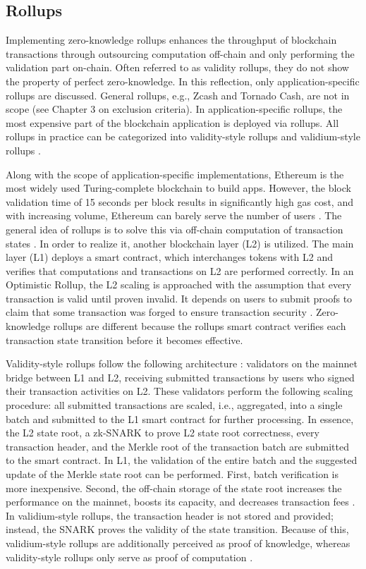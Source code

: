 \subsection{Rollups}
Implementing zero-knowledge rollups enhances the throughput of blockchain transactions through outsourcing computation off-chain and only performing the validation part on-chain. Often referred to as validity rollups, they do not show the property of perfect zero-knowledge. In this reflection, only application-specific rollups are discussed. General rollups, e.g., Zcash and Tornado Cash, are not in scope (see Chapter 3 on exclusion criteria). In application-specific rollups, the most expensive part of the blockchain application is deployed via rollups. All rollups in practice can be categorized into validity-style rollups and validium-style rollups \citep{chen2022review}.

Along with the scope of application-specific implementations, Ethereum is the most widely used Turing-complete blockchain to build apps. However, the block validation time of 15 seconds per block results in significantly high gas cost, and with increasing volume, Ethereum can barely serve the number of users \citep{scalingintro}. The general idea of rollups is to solve this via off-chain computation of transaction states \citep{chen2022review}. In order to realize it, another blockchain layer (L2) is utilized. The main layer (L1) deploys a smart contract, which interchanges tokens with L2 and verifies that computations and transactions on L2 are performed correctly. In an Optimistic Rollup, the L2 scaling is approached with the assumption that every transaction is valid until proven invalid. It depends on users to submit proofs to claim that some transaction was forged to ensure transaction security \citep{zksyncintro}. Zero-knowledge rollups are different because the rollups smart contract verifies each transaction state transition before it becomes effective. 

Validity-style rollups follow the following architecture \citep{buterinrollups}: validators on the mainnet bridge between L1 and L2, receiving submitted transactions by users who signed their transaction activities on L2. These validators perform the following scaling procedure: all submitted transactions are scaled, i.e., aggregated, into a single batch and submitted to the L1 smart contract for further processing. In essence, the L2 state root, a zk-SNARK to prove L2 state root correctness, every transaction header, and the Merkle root of the transaction batch are submitted to the smart contract. In L1, the validation of the entire batch and the suggested update of the Merkle state root can be performed. First, batch verification is more inexpensive. Second, the off-chain storage of the state root increases the performance on the mainnet, boosts its capacity, and decreases transaction fees \citep{chen2022review}. In validium-style rollups, the transaction header is not stored and provided; instead, the SNARK proves the validity of the state transition. Because of this, validium-style rollups are additionally perceived as proof of knowledge, whereas validity-style rollups only serve as proof of computation \citep{validiumintro}. 

